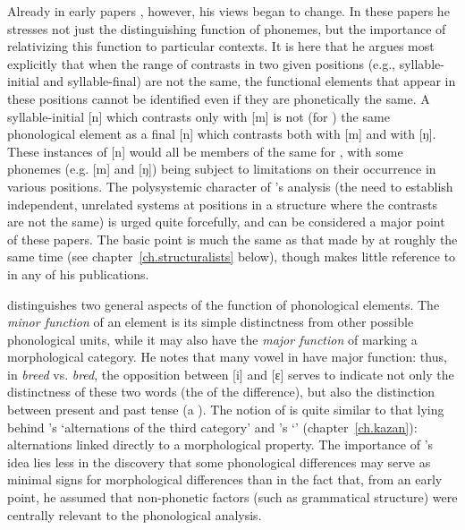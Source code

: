 Already in early papers
\citep{firth35:distribution,firth36:indian,firth.rogers37:hunanese},
however, his views began to {change}. In these papers he stresses not
just the distinguishing function of phonemes, but the importance of
relativizing this function to particular contexts. It is here that he
argues most explicitly that when the range of contrasts in two given
positions (e.g., syllable-initial and syllable-final) are not the
same, the functional elements that appear in these positions cannot be
identified even if they are phonetically the same. A syllable-initial
[n] which contrasts only with [m] is not (for {\Firth}) the same
phonological element as a final [n] which contrasts both with [m] and
with [ŋ]. These instances of [n] would all be members of the same
 for {\Jones}, with some phonemes (e.g. [m] and [ŋ]) being subject
to limitations on their occurrence in various positions. The
polysystemic character of {\Firth}'s analysis (the need to establish
independent, unrelated systems at positions in a structure where the
contrasts are not the same) is urged quite forcefully, and can be
considered a major point of these papers. The basic point is much the
same as that made by \citet{twaddell35:on.defining} at roughly the
same time (see chapter~\ref{ch.structuralists} below), though {\Firth}
makes little reference to {\Twaddell} in any of his publications.

{\Firth} distinguishes two general aspects of the function of
phonological elements. The \emph{minor function} of an element is its
simple distinctness from other possible phonological units, while it
may also have the \emph{major function} of marking a morphological
category. He notes that many vowel  in  have major
function: thus, in \emph{breed} vs. \emph{bred}, the opposition
between [i] and [ɛ] serves to indicate not only the distinctness of
these two words (the  of the difference), but also the
distinction between present and past tense (a ). The
notion of  is quite similar to that lying behind
{\Kruszewski}'s `alternations of the third category' and {\Baudouin}'s
`' (chapter~\ref{ch.kazan}): alternations linked directly
to a morphological property. The importance of {\Firth}'s idea lies less
in the discovery that some phonological differences may serve as
minimal signs for morphological differences than in the fact that,
from an early point, he assumed that non-phonetic factors (such as
grammatical structure) were centrally relevant to the phonological
analysis.

